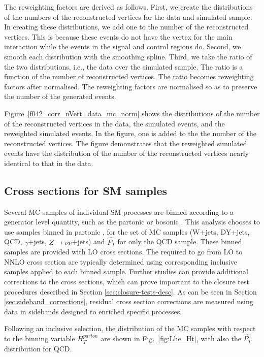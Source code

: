 The reweighting factors are derived as follows. First, we create the
distributions of the numbers of the reconstructed vertices for the data
and simulated sample. In creating these distributions, we add one to the
number of the reconstructed vertices. This is because these events do
not have the vertex for the main interaction while the events in the
signal and control regions do. Second, we smooth each distribution with
the smoothing spline. Third, we take the ratio of the two distributions,
i.e., the data over the simulated sample. The ratio is a function of the
number of reconstructed vertices. The ratio becomes reweighting factors
after normalised. The reweighting factors are normalised so as to
preserve the number of the generated events.

Figure~\ref{f042_corr_nVert_data_mc_norm} shows the distributions of the
number of the reconstructed vertices in the data, the simulated events,
and the reweighted simulated events. In the figure, one is added to the
the number of the reconstructed vertices. The figure demonstrates that
the reweighted simulated events have the distribution of the number of
the reconstructed vertices nearly identical to that in the data.


\subsection{Cross sections for SM samples}
Several MC samples of individual SM processes are binned according to a generator level quantity, such as the partonic \HT or bosonic \PT.
This analysis chooses to use samples binned in partonic \HT, for the set of MC samples (W+jets, DY+jets, QCD, $\gamma$+jets, $Z\rightarrow \nu\nu$+jets) and $\hat{P_{T}}$
for only the QCD sample.
These binned samples are provided with LO cross sections. The \kfactors required to go from LO to NNLO cross section are typically determined using corresponding
inclusive samples applied to each \HT binned sample.
Further studies can provide additional corrections to the cross sections, which can prove important to the closure test procedures described in
Section \ref{sec:closure-tests-desc}. As can be seen in Section \ref{sec:sideband_corrections}, residual cross section
corrections are measured using data in sidebands designed to enriched specific processes.

Following an inclusive selection, the distribution of the MC samples with respect to the binning variable $H_{T}^{parton}$ are shown in Fig.~\ref{fig:Lhe_Ht}, with
also the $\hat{P_{T}}$ distribution for QCD.

